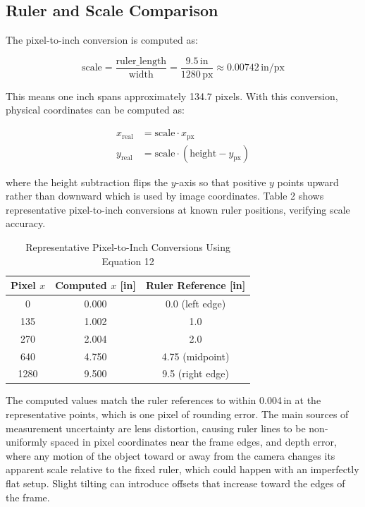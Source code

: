\documentclass{article}
\begin{document}
\newpage
\subsection{Ruler and Scale Comparison}

The pixel-to-inch conversion is computed as:

\begin{equation}
    \text{scale} = \frac{\text{ruler\_length}}{\text{width}} = \frac{9.5\,\text{in}}{1280\,\text{px}} \approx 0.00742\,\text{in/px}
    \label{eq:scale}
\end{equation}

\noindent This means one inch spans approximately 134.7 pixels. With this conversion, physical coordinates can be computed as:

\begin{align}
    x_\text{real} &= \text{scale} \cdot x_\text{px} \\
    y_\text{real} &= \text{scale} \cdot (\text{height} - y_\text{px})
\end{align}

\noindent where the height subtraction flips the $y$-axis so that positive $y$ points upward rather than downward which is used by image coordinates. Table 2 shows representative pixel-to-inch conversions at known ruler positions, verifying scale accuracy.

\begin{table}[H]
    \centering
    \caption{Representative Pixel-to-Inch Conversions Using Equation 12}
    \label{tab:scale_check}
    \begin{tabular}{ccc}
        \toprule
        \textbf{Pixel $x$} & \textbf{Computed $x$ [in]} & \textbf{Ruler Reference [in]} \\
        \midrule
        0     & 0.000 & 0.0 (left edge) \\
        135   & 1.002 & 1.0 \\
        270   & 2.004 & 2.0 \\
        640   & 4.750 & 4.75 (midpoint) \\
        1280  & 9.500 & 9.5 (right edge) \\
        \bottomrule
    \end{tabular}
\end{table}

\noindent The computed values match the ruler references to within 0.004\,in at the representative points, which is one pixel of rounding error. The main sources of measurement uncertainty are lens distortion, causing ruler lines to be non-uniformly spaced in pixel coordinates near the frame edges, and depth error, where any motion of the object toward or away from the camera changes its apparent scale relative to the fixed ruler, which could happen with an imperfectly flat setup. Slight tilting can introduce offsets that increase toward the edges of the frame.
\end{document}
